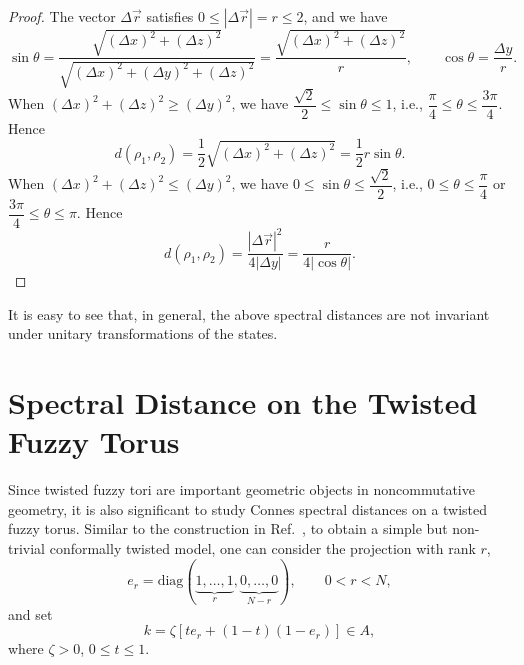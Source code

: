 \documentclass[a4paper,11pt]{article}
\begin{document}
\begin{proof}
  The vector $\Delta \vec{r}$ satisfies $0 \leqslant | \Delta \vec{r} | = r
  \leqslant 2$, and we have
  \begin{equation}
    \sin \theta = \frac{\sqrt{(\Delta x)^2 + (\Delta z)^2}}{\sqrt{(\Delta x)^2
    + (\Delta y)^2 + (\Delta z)^2}} = \frac{\sqrt{(\Delta x)^2 + (\Delta
    z)^2}}{r}, \qquad \cos \theta = \frac{\Delta y}{r} .
  \end{equation}
  When $(\Delta x)^2 + (\Delta z)^2 \geqslant (\Delta y)^2$, we have
  $\dfrac{\sqrt{2}}{2} \leqslant \sin \theta \leqslant 1$, i.e.,
  $\dfrac{\pi}{4} \leqslant \theta \leqslant \dfrac{3 \pi}{4}$. Hence
  \begin{equation}
    d (\rho_1, \rho_2) = \frac{1}{2}  \sqrt{(\Delta x)^2 + (\Delta
    z)^2} = \frac{1}{2} r \sin \theta .
  \end{equation}
  When $(\Delta x)^2 + (\Delta z)^2 \leqslant (\Delta y)^2$, we have $0
  \leqslant \sin \theta \leqslant \dfrac{\sqrt{2}}{2}$, i.e., $0 \leqslant
  \theta \leqslant \dfrac{\pi}{4}$ or $\dfrac{3 \pi}{4} \leqslant \theta
  \leqslant \pi$. Hence
  \begin{equation}
    d (\rho_1, \rho_2) = \frac{| \Delta \vec{r} |^2}{4 | \Delta y|}
    = \dfrac{r}{4 | \cos \theta |} .
  \end{equation}
\end{proof}

It is easy to see that, in general, the above spectral distances are not invariant under unitary transformations of the states.




\section{Spectral Distance on the Twisted Fuzzy Torus}\label{sec5}

Since twisted fuzzy tori are important geometric objects in noncommutative
geometry, it is also significant to study Connes spectral distances on a
twisted fuzzy torus. Similar to the construction in Ref.~\cite{Dabrowski1}, to
obtain a simple but non-trivial conformally twisted model, one can consider the
projection with rank $r$,
\begin{equation}
  e_r = \mathrm{diag} (\underbrace{1, \ldots, 1}_r, \underbrace{0, \ldots,
  0}_{N - r}), \qquad 0 < r < N,
\end{equation}
and set
\begin{equation}
  k = \zeta [te_r + (1 - t) (1 - e_r)] \in A,
\end{equation}
where $\zeta > 0$, $0 \leqslant t \leqslant 1$.
\end{document}
